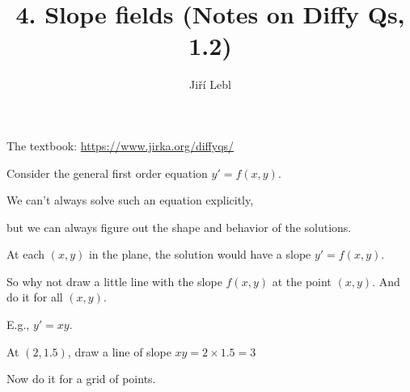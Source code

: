 \documentclass[10pt,aspectratio=169]{beamer}
\author{Ji\v{r}\'i Lebl}
\institute[OSU]{%
Oklahoma State University%
}
\title{4. Slope fields (Notes on Diffy Qs, 1.2)}
\date{}
\begin{document}
\begin{frame}
\titlepage


\begin{center}
The textbook: \url{https://www.jirka.org/diffyqs/}
\end{center}
\end{frame}

\begin{frame}
Consider the general first order equation \quad $y' = f(x,y)$.

\medskip
\pause

We can't always solve such an equation explicitly,

\pause
but we can always figure out the shape and behavior of the solutions.

\medskip
\pause

At each $(x,y)$ in the plane, the solution would have a slope $y' = f(x,y)$.

\medskip
\pause

So why not draw a little line with the slope $f(x,y)$ at the point $(x,y)$.
\pause
And do it for all $(x,y)$.

\medskip

E.g., $y'=xy$. \pause

At $(2,1.5)$, draw a line of slope
$xy = 2 \times 1.5 = 3$

\vspace*{-24pt}
\hspace*{3in}

\vspace*{-1.53in}
\pause
Now do it for a grid of points.

\vspace*{-42.5pt}
\hspace*{3in}


\end{frame}
\end{document}
